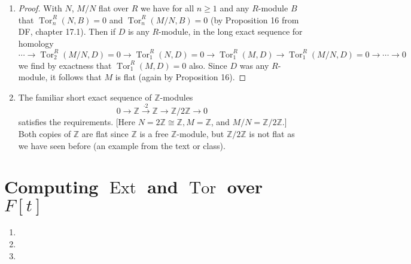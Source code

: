 \documentclass[11pt]{article}
\DeclareMathOperator{\Tor}{Tor}
\DeclareMathOperator{\Ext}{Ext}
\begin{document}
\begin{enumerate}[label=(\alph*)]
    Aside from this, it claims that the original short exact sequence \[0\to N\to M \to M/N\to 0\] splits anyways since $N$ is flat, which is a non sequitur since we already found a counterexample. For some reason ChatGPT does not stop here as this would have ``proved'' its claim: it attempts to produce yet again another section, and attempts to compose these two sections (which it cannot do since both sections have the same domain and codomain). Only after ``composing'' these two sections that it got from nowhere does it conclude the proof. This proof does not work, but it is impressive that it is written in the tone of a mathematical proof and uses mathematical language in a way that is ``right'' but not logically correct (e.g. it knows what it means for a short exact sequence to split but doesn't know that the above sequence splitting does not follow from either $N$ or $M/N$ being flat).
    \item \begin{proof}
        With $N$, $M/N$ flat over $R$ we have for all $n\geq 1$ and any $R$-module $B$ that $\Tor_n^R(N,B) = 0$ and $\Tor_n^R(M/N,B) = 0$ (by Proposition 16 from DF, chapter 17.1). Then if $D$ is any $R$-module, in the long exact sequence for homology  \[\cdots\to \Tor_2^R(M/N,D) =0\to \Tor_1^R(N,D) = 0\to \Tor_1^R(M,D)\to \Tor_1^R(M/N,D) = 0\to\cdots\to 0\] we find by exactness that $ \Tor_1^R(M,D) = 0$ also. Since $D$ was any $R$-module, it follows that $M$ is flat (again by Proposition 16).
    \end{proof}
    \item The familiar short exact sequence of $\mathbb{Z}$-modules \[0\to \mathbb{Z}\xrightarrow{\cdot 2}\mathbb{Z}\to \mathbb{Z}/2\mathbb{Z}\to 0\] satisfies the requirements. [Here $N = 2\mathbb{Z}\cong\mathbb{Z}, M = \mathbb{Z}$, and $M/N = \mathbb{Z}/2\mathbb{Z}$.] Both copies of $\mathbb{Z}$ are flat since $\mathbb{Z}$ is a free $\mathbb{Z}$-module, but $\mathbb{Z}/2\mathbb{Z}$ is not flat as we have seen before (an example from the text or class).
   \end{enumerate}
\section{Computing $\Ext$ and $\Tor$ over $F[t]$}
\begin{enumerate}[label=(\alph*)]
    \item 
    \item 
    \item 
   \end{enumerate}
\end{document}

